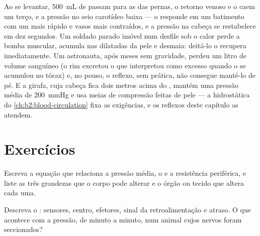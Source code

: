 \begin{example}\label{ex:b2:blood-pressure:standing}
Ao se levantar, \qty{500}{mL} de  passam para as  das
pernas, o retorno venoso e o  caem um terço, e a
pressão no seio carotídeo baixa --- o  responde em um
batimento com um  mais rápido e vasos mais contraídos, e a
pressão na cabeça se restabelece em dez segundos. Um soldado parado
imóvel num desfile sob o calor perde a bomba muscular, acumula 
nas  dilatadas da pele e desmaia: deitá-lo o recupera
imediatamente. Um astronauta, após meses sem gravidade, perdeu um litro
de volume sanguíneo (o rim excretou o que interpretou como excesso
quando o  se acumulou no tórax) e, no pouso, o reflexo, sem
prática, não consegue mantê-lo de pé. E a girafa, cuja cabeça fica dois
metros acima do , mantém uma pressão média de \qty{200}{mmHg} e
usa meias de compressão feitas de pele --- a hidrostática do \cref{ch:b2:blood-circulation}
fixa as exigências, e os reflexos deste capítulo as atendem.
\end{example}

\section{Exercícios}

\begin{exercise}[$\star$]\label{exo:b2:blood-pressure:1}
Escreva a equação que relaciona a pressão média, o  e a
resistência periférica, e liste as três grandezas que o corpo pode
alterar e o órgão ou tecido que altera cada uma.
\end{exercise}

\begin{exercise}[$\star$]\label{exo:b2:blood-pressure:2}
Descreva o : sensores, centro, efetores, sinal da
retroalimentação e atraso. O que acontece com a pressão, de minuto a
minuto, num animal cujos nervos  foram seccionados?
\end{exercise}

